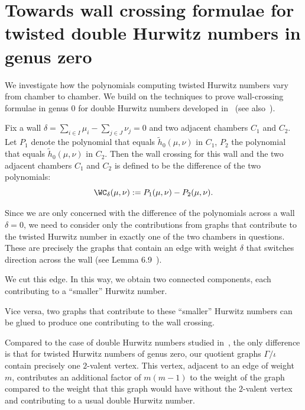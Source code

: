 \section{Towards wall crossing formulae for twisted double Hurwitz numbers in genus zero}

We investigate how the polynomials computing twisted Hurwitz numbers vary from chamber to chamber. 
We build on the techniques to prove wall-crossing formulae in genus $0$ for double Hurwitz numbers developed in~\cite{CJM10} (see also~\cite{SSV08}). 

\begin{defi}
Fix a wall $\delta=\sum_{i\in I}\mu_i - \sum_{j\in J}\nu_j=0$ and two adjacent chambers $C_1$ and $C_2$. Let $P_1$ denote the polynomial that equals $\tilde{h}_0(\mu,\nu)$ in $C_1$, $P_2$ the polynomial that equals $\tilde{h}_0(\mu,\nu)$ in $C_2$.
Then the wall crossing for this wall and the two adjacent chambers $C_1$ and $C_2$ is defined to be the difference of the two polynomials:
\begin{equation*}
\WC_{\delta}(\mu,\nu):=P_1(\mu,\nu)-P_2(\mu,\nu).
\end{equation*}

\end{defi}
 
Since we are only concerned with the difference of the polynomials across a wall $\delta=0$, we need to consider only the contributions from graphs that contribute to the twisted Hurwitz number in exactly one of the two chambers in questions. These are precisely the graphs that  contain an edge with weight $\delta$ that switches direction across the wall (see Lemma 6.9~\cite{CJM10}). 

We cut this edge. In this way, we obtain two connected components, each contributing to a ``smaller'' Hurwitz number.

Vice versa, two graphs that contribute to these ``smaller'' Hurwitz numbers can be glued to produce one contributing to the wall crossing.

Compared to the case of double Hurwitz numbers studied in~\cite{CJM10}, the only difference is that for twisted Hurwitz numbers of genus zero, our quotient graphs $\Gamma/\iota$ contain precisely one $2$-valent vertex. This vertex, adjacent to an edge of weight $m$, contributes an additional factor of $m(m-1)$ to the weight of the graph compared to the weight that this graph would have without the $2$-valent vertex and contributing to a usual double Hurwitz number.

